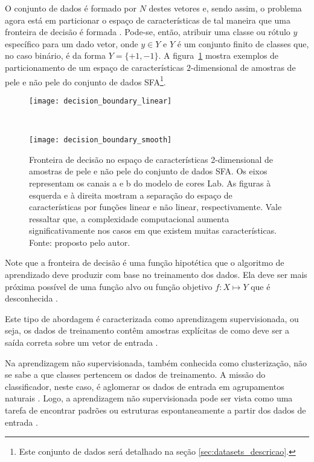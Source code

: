 O conjunto de dados é formado por $N$ destes vetores e, sendo assim, o problema agora está em particionar o espaço de características de tal maneira que uma fronteira de decisão é formada \citep{duda:12}. Pode-se, então, atribuir uma classe ou rótulo $y$ específico para um dado vetor, onde $y \in Y$ e $Y$ é um conjunto finito de classes que, no caso binário, é da forma $Y = \{+1, -1\}$. A figura~\ref{fig:decision_boundary} mostra exemplos de particionamento de um espaço de características $2$-dimensional de amostras de pele e não pele do conjunto de dados SFA\footnote{Este conjunto de dados será detalhado na seção \ref{sec:datasets_descricao}.}.

\begin{figure}[h]
    \centering
    \begin{minipage}{0.48\textwidth}
        \texttt{[image: decision\_boundary\_linear]}
        \label{fig:decision_boundary_linear}
    \end{minipage}
    ~ %
    \begin{minipage}{0.48\textwidth}
        \texttt{[image: decision\_boundary\_smooth]}
        \label{fig:decision_boundary_smooth}
    \end{minipage}
    \caption[Fronteira de decisão no espaço de características 2-dimensional]{Fronteira de decisão no espaço de características 2-dimensional de amostras de pele e não pele do conjunto de dados SFA. Os eixos representam os canais a e b do modelo de cores Lab. As figuras à esquerda e à direita mostram a separação do espaço de características por funções linear e não linear, respectivamente. Vale ressaltar que, a complexidade computacional aumenta significativamente nos casos em que existem muitas características. Fonte: proposto pelo autor.}
    \label{fig:decision_boundary}
\end{figure}

Note que a fronteira de decisão é uma função hipotética que o algoritmo de aprendizado deve produzir com base no treinamento dos dados. Ela deve ser mais próxima possível de uma função alvo ou função objetivo $f : X\mapsto Y$ que é desconhecida \citep{mostafa:12}.

Este tipo de abordagem é caracterizada como aprendizagem supervisionada, ou seja, os dados de treinamento contêm amostras explícitas de como deve ser a saída correta sobre um vetor de entrada \citep{mostafa:12}.

Na aprendizagem não supervisionada, também conhecida como clusterização, não se sabe a que classes pertencem os dados de treinamento. A missão do classificador, neste caso, é aglomerar os dados de entrada em agrupamentos naturais \citep{duda:12}. Logo, a aprendizagem não supervisionada pode ser vista como uma tarefa de encontrar padrões ou estruturas espontaneamente a partir dos dados de entrada \citep{mostafa:12}.

